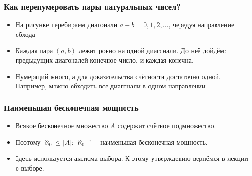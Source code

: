\documentclass[10pt]{beamer}
\begin{document}
\begin{frame}
    \frametitle{Как перенумеровать пары натуральных чисел?}
    \centering
    \begin{itemize}
        \item<2-> На рисунке перебираем диагонали $a+b=0,1,2,\ldots$, чередуя направление обхода.
        \item<3-> Каждая пара $(a,b)$ лежит ровно на одной диагонали. До неё дойдём: предыдущих диагоналей конечное число, и каждая конечна.
        \item<4-> Нумераций много, а для доказательства счётности достаточно одной. Например, можно обходить все диагонали в одном направлении.
    \end{itemize}
\end{frame}

\begin{frame}
    \frametitle{Наименьшая бесконечная мощность}
    \begin{itemize}
        \item Всякое бесконечное множество $A$ содержит счётное подмножество.
        \item<2-> Поэтому $\aleph_0\leq |A|$: $\aleph_0$ "--- наименьшая бесконечная мощность.
        \item<2-> Здесь используется аксиома выбора. К этому утверждению вернёмся в лекции о выборе.
    \end{itemize}
\end{frame}
\end{document}
